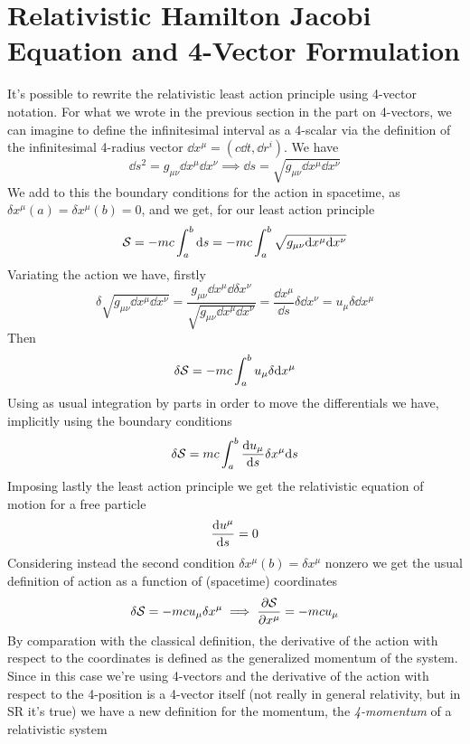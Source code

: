 \documentclass[../admech.tex]{subfiles}
\begin{document}
\section{Relativistic Hamilton Jacobi Equation and 4-Vector Formulation}
It's possible to rewrite the relativistic least action principle using 4-vector notation. For what we wrote in the previous section in the part on 4-vectors, we can imagine to define the infinitesimal interval as a 4-scalar via the definition of the infinitesimal 4-radius vector $\dd x^\mu=(c\dd t,\dd r^i)$. We have
\begin{equation}
	\dd s^2=g_{\mu\nu}\dd x^\mu\dd x^\nu\implies\dd s=\sqrt{g_{\mu\nu}\dd x^\mu\dd x^\nu}
	\label{eq:dsact}
\end{equation}
We add to this the boundary conditions for the action in spacetime, as $\delta x^\mu(a)=\delta x^\mu(b)=0$, and we get, for our least action principle
\begin{equation}
	\mathcal{S}=-mc\int_{a}^{b}\dd s=-mc\int_{a}^{b}\sqrt{g_{\mu\nu}\dd x^\mu\dd x^\nu}
	\label{eq:relact}
\end{equation}
Variating the action we have, firstly
\begin{equation*}
	\delta\sqrt{g_{\mu\nu}\dd x^\mu\dd x^\nu}=\frac{g_{\mu\nu}\dd x^\mu\dd\delta x^\nu}{\sqrt{g_{\mu\nu}\dd x^\mu\dd x^\nu}}=\frac{\dd x^\mu}{\dd s}\delta\dd x^\nu=u_\mu\delta\dd x^\mu
\end{equation*}
Then
\begin{equation*}
	\delta\mathcal{S}=-mc\int_{a}^{b}u_\mu\delta\dd x^\mu
\end{equation*}
Using as usual integration by parts in order to move the differentials we have, implicitly using the boundary conditions
\begin{equation}
	\delta\mathcal{S}=mc\int_{a}^{b}\dv{u_\mu}{s}\delta x^\mu\dd s
	\label{eq:actvarrel}
\end{equation}
Imposing lastly the least action principle we get the relativistic equation of motion for a free particle
\begin{equation}
	\dv{u^\mu}{s}=0
	\label{eq:eqmrel}
\end{equation}
Considering instead the second condition $\delta x^\mu(b)=\delta x^\mu$ nonzero we get the usual definition of action as a function of (spacetime) coordinates
\begin{equation*}
	\delta\mathcal{S}=-mcu_\mu\delta x^\mu\implies{}\pdv{\mathcal{S}}{x^\mu}=-mcu_\mu
\end{equation*}
By comparation with the classical definition, the derivative of the action with respect to the coordinates is defined as the generalized momentum of the system. Since in this case we're using 4-vectors and the derivative of the action with respect to the 4-position is a 4-vector itself (not really in general relativity, but in SR it's true) we have a new definition for the momentum, the \emph{4-momentum} of a relativistic system
\end{document}
